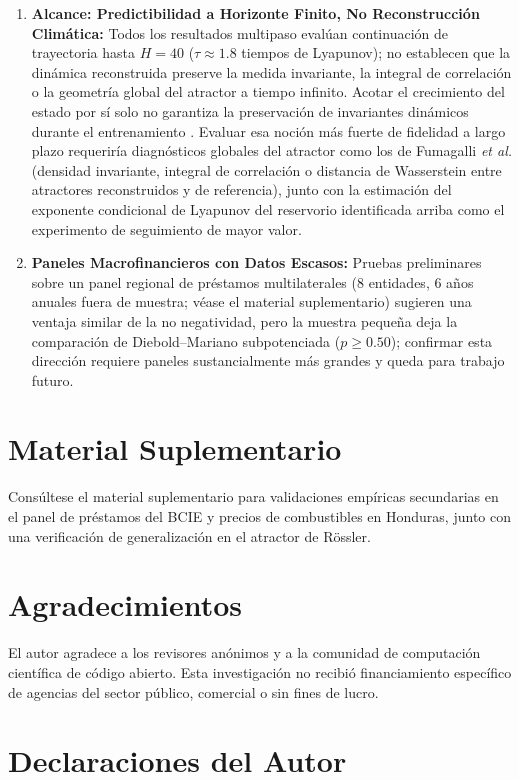 \documentclass[aip,cha,reprint,amsmath,amssymb]{revtex4-2}
\begin{document}
\begin{enumerate}
    \item \textbf{Alcance: Predictibilidad a Horizonte Finito, No Reconstrucción Climática:} Todos los resultados multipaso evalúan continuación de trayectoria hasta $H=40$ ($\tau \approx 1.8$ tiempos de Lyapunov); no establecen que la dinámica reconstruida preserve la medida invariante, la integral de correlación o la geometría global del atractor a tiempo infinito. Acotar el crecimiento del estado por sí solo no garantiza la preservación de invariantes dinámicos durante el entrenamiento \cite{platt2023constraining}. Evaluar esa noción más fuerte de fidelidad a largo plazo requeriría diagnósticos globales del atractor como los de Fumagalli \emph{et al.} \cite{fumagalli2025datadriven} (densidad invariante, integral de correlación o distancia de Wasserstein entre atractores reconstruidos y de referencia), junto con la estimación del exponente condicional de Lyapunov del reservorio identificada arriba como el experimento de seguimiento de mayor valor.
    \item \textbf{Paneles Macrofinancieros con Datos Escasos:} Pruebas preliminares sobre un panel regional de préstamos multilaterales (8 entidades, 6 años anuales fuera de muestra; véase el material suplementario) sugieren una ventaja similar de la no negatividad, pero la muestra pequeña deja la comparación de Diebold--Mariano subpotenciada ($p \ge 0.50$); confirmar esta dirección requiere paneles sustancialmente más grandes y queda para trabajo futuro.
\end{enumerate}

\section*{Material Suplementario}
Consúltese el material suplementario para validaciones empíricas secundarias en el panel de préstamos del BCIE y precios de combustibles en Honduras, junto con una verificación de generalización en el atractor de R\"ossler.

\section*{Agradecimientos}
El autor agradece a los revisores anónimos y a la comunidad de computación científica de código abierto. Esta investigación no recibió financiamiento específico de agencias del sector público, comercial o sin fines de lucro.

\section*{Declaraciones del Autor}
\end{document}
